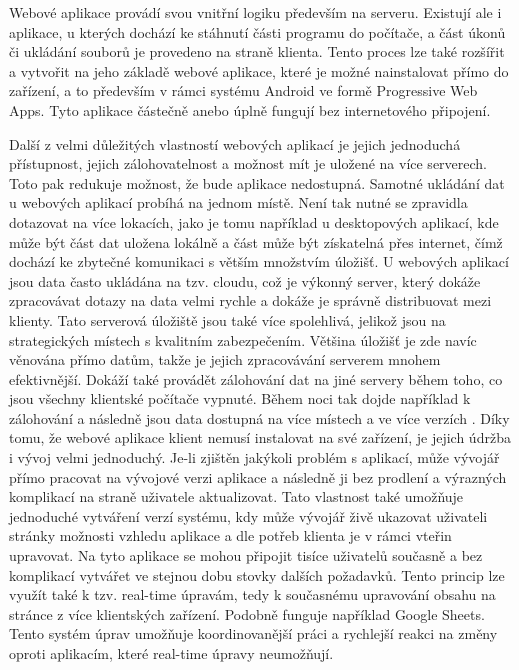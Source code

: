 Webové aplikace provádí svou vnitřní logiku především na serveru. Existují ale i aplikace, u kterých dochází ke stáhnutí části programu do počítače, a část úkonů či ukládání souborů je provedeno na straně klienta. Tento proces lze také rozšířit a vytvořit na jeho základě webové aplikace, které je možné nainstalovat přímo do zařízení, a to především v rámci systému Android ve formě Progressive Web Apps. Tyto aplikace částečně anebo úplně fungují bez internetového připojení.

Další z velmi důležitých vlastností webových aplikací je jejich jednoduchá přístupnost, jejich zálohovatelnost a možnost mít je uložené na více serverech. Toto pak redukuje možnost, že bude aplikace nedostupná. Samotné ukládání dat u webových aplikací probíhá na jednom místě. Není tak nutné se zpravidla dotazovat na více lokacích, jako je tomu například u desktopových aplikací, kde může být část dat uložena lokálně a část může být získatelná přes internet, čímž dochází ke zbytečné komunikaci s větším množstvím úložišť. U webových aplikací jsou data často ukládána na tzv. cloudu, což je výkonný server, který dokáže zpracovávat dotazy na data velmi rychle a dokáže je správně distribuovat mezi klienty. Tato serverová úložiště jsou také více spolehlivá, jelikož jsou na strategických místech s kvalitním zabezpečením. Většina úložišť je zde navíc věnována přímo datům, takže je jejich zpracovávání serverem mnohem efektivnější. Dokáží také provádět zálohování dat na jiné servery během toho, co jsou všechny klientské počítače vypnuté. Během noci tak dojde například k zálohování a následně jsou data dostupná na více místech a ve více verzích \cite{modernapps}.
Díky tomu, že webové aplikace klient nemusí instalovat na své zařízení, je jejich údržba i vývoj velmi jednoduchý. Je-li zjištěn jakýkoli problém s aplikací, může vývojář přímo pracovat na vývojové verzi aplikace a následně ji bez prodlení a výrazných komplikací na straně uživatele aktualizovat. Tato vlastnost také umožňuje jednoduché vytváření verzí systému, kdy může vývojář živě ukazovat uživateli stránky možnosti vzhledu aplikace a dle potřeb klienta je v rámci vteřin upravovat. Na tyto aplikace se mohou připojit tisíce uživatelů současně a bez komplikací vytvářet ve stejnou dobu stovky dalších požadavků. Tento princip lze využít také k tzv. real-time úpravám, tedy k současnému upravování obsahu na stránce z více klientských zařízení. Podobně funguje například Google Sheets. Tento systém úprav umožňuje koordinovanější práci a rychlejší reakci na změny oproti aplikacím, které real-time úpravy neumožňují.

